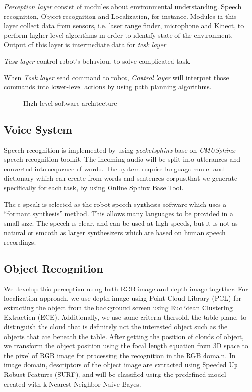 \documentclass{llncs}
\newcommand{\dq}[1]{``#1''}
\begin{document}
\textit{Perception layer} consist of modules about environmental understanding. Speech recognition, Object recognition and Localization, for instance. Modules in this layer collect data from sensors, i.e. laser range finder, microphone and Kinect, to perform higher-level algorithms in order to identify state of the environment. Output of this layer is intermediate data for \textit{task layer}

\textit{Task layer} control robot's behaviour to solve complicated task.

When \textit{Task layer} send command to robot, \textit{Control layer} will interpret those commands into lower-level actions by using path planning algorithms.

\begin{figure}
\centering
\caption{High level software architecture}
\label{fig:soft_arc}
\end{figure}

\subsection{Voice System}

Speech recognition is implemented by using \textit{pocketsphinx} base on \textit{CMUSphinx} speech recognition toolkit. The incoming audio will be split into utterances and converted into sequence of words. The system require language model and dictionary which can create from words and sentences corpus,that we generate specifically for each task, by using Online Sphinx Base Tool.

The e-speak is selected as the robot speech synthesis software which uses a \dq{formant synthesis} method. This allows many languages to be provided in a small size. The speech is clear, and can be used at high speeds, but it is not as natural or smooth as larger synthesizers which are based on human speech recordings.

\subsection{Object Recognition}

We develop this perception using both RGB image and depth image together. For localization approach, we use depth image using Point Cloud Library (PCL) for extracting the object from the background screen using Euclidean Clustering Extraction (ECE). Additionally, we use some criteria thersold, the table plane, to distinguish the cloud that is definitely not the interested object such as the objects that are beneath the table. After getting the position of clouds of object, we transform the object position using the focal length equation from 3D space to the pixel of RGB image for processing the recognition in the RGB domain. In image domain, descriptors of the object image are extracted using Speeded Up Robust Features (SURF), and will be classified using the predefined model created with k-Nearest Neighbor Naive Bayes.
\end{document}
